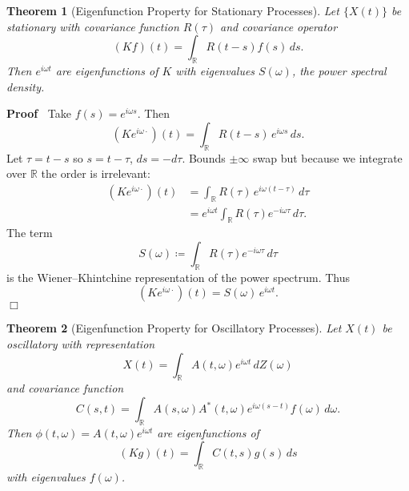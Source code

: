 \documentclass{article}
\newenvironment{proof}{\noindent\textbf{Proof\ }}{\hspace*{\fill}$\Box$\medskip}
\newtheorem{theorem}{Theorem}
\begin{document}
\begin{theorem}
  [Eigenfunction Property for Stationary Processes]
  Let $\{X (t)\}$ be stationary with covariance function $R (\tau)$
  and covariance operator
  \[
  (Kf) (t) = \int_{\mathbb{R}} R (t - s) f(s)\, ds.
  \]
  Then $e^{i \omega t}$ are eigenfunctions of $K$
  with eigenvalues $S (\omega)$, the power spectral density.
\end{theorem}

\begin{proof}
Take $f(s) = e^{i\omega s}$. Then
\[
(K e^{i\omega \cdot})(t) = \int_{\mathbb{R}} R(t-s)\, e^{i\omega s} \, ds.
\]
Let $\tau = t - s$ so $s = t - \tau$, $ds = -d\tau$. Bounds $\pm\infty$ swap but because we integrate over $\mathbb{R}$ the order is irrelevant:
\begin{align*}
(K e^{i\omega \cdot})(t) &= \int_{\mathbb{R}} R(\tau)\, e^{i\omega (t-\tau)} \, d\tau \\
&= e^{i\omega t} \int_{\mathbb{R}} R(\tau) e^{-i\omega \tau} \, d\tau.
\end{align*}
The term
\[
S(\omega) \coloneqq \int_{\mathbb{R}} R(\tau) e^{-i\omega \tau} \, d\tau
\]
is the Wiener--Khintchine representation of the power spectrum. Thus
\[
(K e^{i\omega\cdot})(t) = S(\omega) \, e^{i\omega t}.
\]
\end{proof}

\begin{theorem}
  [Eigenfunction Property for Oscillatory Processes]
  Let $X(t)$ be oscillatory with representation
  \[
  X (t) = \int_{\mathbb{R}} A (t, \omega) e^{i \omega t} \, dZ (\omega)
  \]
  and covariance function
  \[
  C(s, t) = \int_{\mathbb{R}} A(s, \omega) A^{\ast} (t, \omega) e^{i\omega(s-t)} f(\omega) \, d \omega.
  \]
  Then $\phi(t,\omega) = A(t,\omega) e^{i\omega t}$ are eigenfunctions of
  \[
  (K g)(t) = \int_{\mathbb{R}} C(t,s) g(s) \, ds
  \]
  with eigenvalues $f(\omega)$.
\end{theorem}
\end{document}
